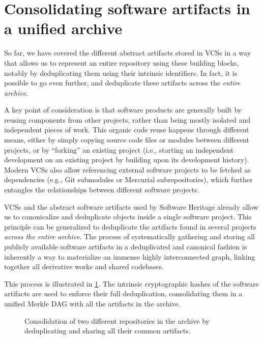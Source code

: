 \section{Consolidating software artifacts in a unified archive}%
\label{sec:consolidation}

So far, we have covered the different abstract artifacts stored in \glspl{VCS}
in a way that allows us to represent an entire repository using these building
blocks, notably by deduplicating them using their intrinsic identifiers.
In fact, it is possible to go even further, and deduplicate these artifacts
across the \emph{entire archive}.

A key point of consideration is that software products are generally built by
reusing components from other projects, rather than being mostly isolated and
independent pieces of work. This organic code reuse happens through different
means, either by simply copying source code files or modules between different
projects, or by ``forking'' an existing project (i.e., starting an independent
development on an existing project by building upon its development history).
Modern \glspl{VCS} also allow referencing external software projects to be
fetched as dependencies (e.g., Git submodules or Mercurial subrepositories),
which further entangles the relationships between different software projects.

\glspl{VCS} and the abstract software artifacts used by Software Heritage
already allow us to canonicalize and deduplicate objects inside a single
software project. This principle can be generalized to deduplicate the
artifacts found in several projects \emph{across the entire archive}.
The process of systematically gathering and storing all publicly available
software artifacts in a deduplicated and canonical fashion is inherently a way
to materialize an immense highly interconnected graph, linking together all
derivative works and shared codebases.

This process is illustrated in \cref{fig:consolidating-archive}. The
intrinsic cryptographic hashes of the software artifacts are used to enforce
their full deduplication, consolidating them in a unified Merkle \gls{DAG} with
all the artifacts in the archive.

\begin{figure}
    \centering
    
    \caption{Consolidation of two different repositories in the archive by
    deduplicating and sharing all their common artifacts.}%
    \label{fig:consolidating-archive}
\end{figure}


